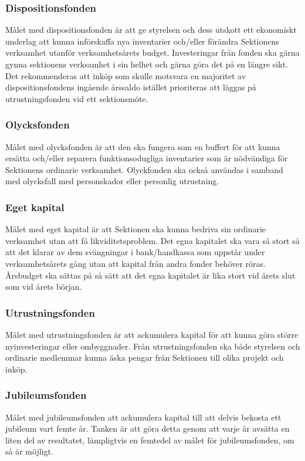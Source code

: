 \documentclass[10pt]{article}
\begin{document}
\subsubsection*{Dispositionsfonden}
Målet med dispositionsfonden är att ge styrelsen och dess utskott ett ekonomiskt underlag att kunna införskaffa nya inventarier och/eller förändra Sektionens verksamhet utanför verksamhetsårets budget. Investeringar från fonden ska gärna gynna sektionens verksamhet i sin helhet och gärna göra det på en längre sikt. Det rekommenderas att inköp som skulle motsvara en majoritet av dispositionsfondens ingående årssaldo istället prioriteras att läggas på utrustningsfonden vid ett sektionsmöte.

\subsubsection*{Olycksfonden}
Målet med olycksfonden är att den ska fungera som en buffert för att kunna ersätta och/eller reparera funktionsodugliga inventarier som är nödvändiga för Sektionens ordinarie verksamhet. Olyckfonden ska också användas i samband med olycksfall med personskador eller personlig utrustning.

\subsubsection*{Eget kapital}
Målet med eget kapital är att Sektionen ska kunna bedriva sin ordinarie verksamhet utan att få likviditetsproblem. Det egna kapitalet ska vara så stort så att det klarar av dem svängningar i bank/handkassa som uppstår under verksamhetsårets gång utan att kapital från andra fonder behöver röras. Årsbudget ska sättas på så sätt att det egna kapitalet är lika stort vid årets slut som vid årets början.

\subsubsection*{Utrustningsfonden}
Målet med utrustningsfonden är att ackumulera kapital för att kunna göra större nyinvesteringar eller ombyggnader. Från utrustningsfonden ska både styrelsen och ordinarie medlemmar kunna äska pengar från Sektionen till olika projekt och inköp.

\subsubsection*{Jubileumsfonden}
Målet med jubileumsfonden att ackumulera kapital till att delvis bekosta ett jubileum vart femte år. Tanken är att göra detta genom att varje år avsätta en liten del av resultatet, lämpligtvis en femtedel av målet för jubileumsfonden, om så är möjligt.
\end{document}
